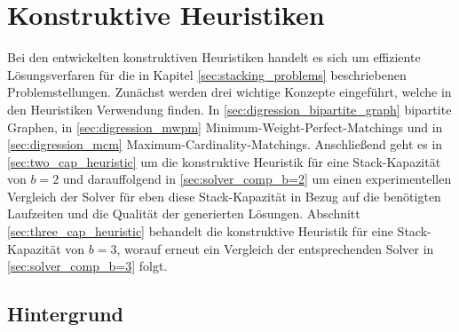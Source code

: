 





\pagebreak

\section{Konstruktive Heuristiken}
\label{sec:constructive_heuristics}

Bei den entwickelten konstruktiven Heuristiken handelt es sich um effiziente Lösungsverfaren für die in Kapitel \ref{sec:stacking_problems}
beschriebenen Problemstellungen. Zunächst werden drei wichtige Konzepte eingeführt, welche in den Heuristiken Verwendung finden.
In \ref{sec:digression_bipartite_graph} bipartite Graphen, in \ref{sec:digression_mwpm} Minimum-Weight-Perfect-Matchings und in \ref{sec:digression_mcm} Maximum-Cardinality-Matchings. Anschließend geht es in \ref{sec:two_cap_heuristic} um die konstruktive Heuristik
für eine Stack-Kapazität von $b=2$ und darauffolgend in \ref{sec:solver_comp_b=2} um einen experimentellen Vergleich der Solver für
eben diese Stack-Kapazität in Bezug auf die benötigten Laufzeiten und die Qualität der generierten Lösungen.
Abschnitt \ref{sec:three_cap_heuristic} behandelt die konstruktive Heuristik für eine Stack-Kapazität von $b=3$, worauf erneut ein Vergleich der entsprechenden Solver in \ref{sec:solver_comp_b=3} folgt.

\subsection{Hintergrund}


